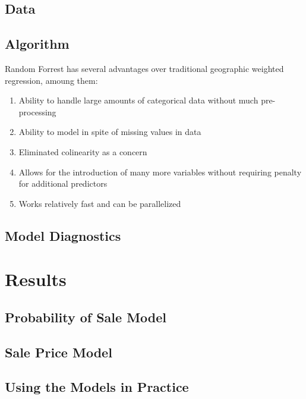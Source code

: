 \documentclass[]{article}
\providecommand{\tightlist}{%
  \setlength{\itemsep}{0pt}\setlength{\parskip}{0pt}}
\begin{document}
\subsection{Data}\label{data}

\subsection{Algorithm}\label{algorithm}

Random Forrest has several advantages over traditional geographic
weighted regression, amoung them:

\begin{enumerate}
\def\labelenumi{\arabic{enumi}.}
\tightlist
\item
  Ability to handle large amounts of categorical data without much
  pre-processing
\item
  Ability to model in spite of missing values in data
\item
  Eliminated colinearity as a concern
\item
  Allows for the introduction of many more variables without requiring
  penalty for additional predictors
\item
  Works relatively fast and can be parallelized
\end{enumerate}

\subsection{Model Diagnostics}\label{model-diagnostics}

\section{Results}\label{results}

\subsection{Probability of Sale Model}\label{probability-of-sale-model}

\subsection{Sale Price Model}\label{sale-price-model}

\subsection{Using the Models in
Practice}\label{using-the-models-in-practice}
\end{document}

